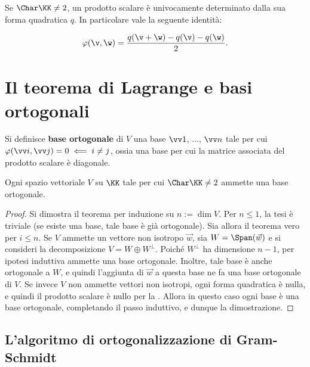 \begin{proposition} \label{prop:formula_polarizzazione}
	Se $\Char \KK \neq 2$, un prodotto scalare è univocamente determinato dalla sua forma quadratica $q$.
	In particolare vale la seguente identità:
	
	\[ \varphi(\v, \w) = \frac{q(\v + \w) - q(\v) - q(\w)}{2}. \]
	
	\vskip 0.05in
\end{proposition}

\section{Il teorema di Lagrange e basi ortogonali}

\begin{definition}
	Si definisce \textbf{base ortogonale} di $V$ una base $\vv 1$, ..., $\vv n$ tale per cui $\varphi(\vv i, \vv j) = 0
	\impliedby i \neq j$, ossia una base per cui la matrice associata del prodotto scalare è diagonale. 
\end{definition}

\begin{theorem}[di Lagrange]
	Ogni spazio vettoriale $V$ su $\KK$ tale per cui $\Char \KK \neq 2$ ammette una base ortogonale.
\end{theorem}

\begin{proof}
	Si dimostra il teorema per induzione su $n := \dim V$. Per $n \leq 1$, la tesi è triviale (se esiste una base, tale base è
	già ortogonale). Sia
	allora il teorema vero per $i \leq n$. Se $V$ ammette un vettore non isotropo $\vec w$, sia $W = \Span(\vec w)$ e si consideri la decomposizione $V = W \oplus W^\perp$. Poiché $W^\perp$ ha dimensione $n-1$, per ipotesi induttiva
	ammette una base ortogonale. Inoltre, tale base è anche ortogonale a $W$, e quindi l'aggiunta di $\vec w$ a
	questa base ne fa una base ortogonale di $V$. Se invece $V$ non ammette vettori non isotropi, ogni forma quadratica
	è nulla, e quindi il prodotto scalare è nullo per la \textit{}. Allora in questo caso
	ogni base è una base ortogonale, completando il passo induttivo, e dunque la dimostrazione.
\end{proof}

\subsection{L'algoritmo di ortogonalizzazione di Gram-Schmidt}

